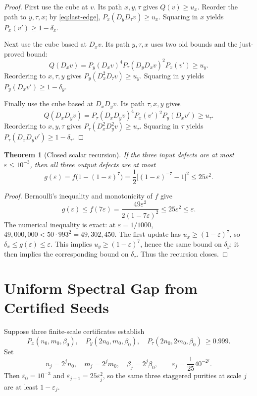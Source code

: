 \documentclass[11pt]{article}
\newcommand{\ee}{\varepsilon}
\newtheorem{theorem}{Theorem}
\begin{document}
\begin{proof}
	First use the cube at \(v\). Its path \(x,y,\tau\) gives
	\(Q(v)\ge u_x\). Reorder the path to \(y,\tau,x\); by
	\eqref{eq:last-edge},
	\(P_x(D_yD_\tau v)\ge u_x\).
	Squaring in \(x\) yields \(P_x(v')\ge1-\delta_x\).

	Next use the cube based at \(D_xv\). Its path \(y,\tau,x\) uses two
	old bounds and the just-proved bound:
	\[
		Q(D_xv)=P_y(D_xv)^4P_\tau(D_yD_xv)^2P_x(v')\ge u_y.
	\]
	Reordering to \(x,\tau,y\) gives
	\(P_y(D_x^2D_\tau v)\ge u_y\).
	Squaring in \(y\) yields \(P_y(D_xv')\ge1-\delta_y\).

	Finally use the cube based at \(D_xD_yv\). Its path \(\tau,x,y\)
	gives
	\[
		Q(D_xD_yv)=P_\tau(D_xD_yv)^4P_x(v')^2P_y(D_xv')\ge u_\tau.
	\]
	Reordering to \(x,y,\tau\) gives
	\(P_\tau(D_x^2D_y^2v)\ge u_\tau\).
	Squaring in \(\tau\) yields \(P_\tau(D_xD_yv')\ge1-\delta_\tau\).
\end{proof}

\begin{theorem}[Closed scalar recursion]
	If the three input defects are at most \(\ee\le10^{-3}\), then all
	three output defects are at most
	\begin{equation}
		g(\ee)=f\bigl(1-(1-\ee)^7\bigr)
		=\frac12\bigl[(1-\ee)^{-7}-1\bigr]^2
		\le25\ee^2.
		\label{eq:scalar}
	\end{equation}
\end{theorem}

\begin{proof}
	Bernoulli's inequality and monotonicity of \(f\) give
	\[
		g(\ee)\le f(7\ee)
		=\frac{49\ee^2}{2(1-7\ee)^2}
		\le25\ee^2\le\ee.
	\]
	The numerical inequality is exact: at \(\ee=1/1000\),
	\(49{,}000{,}000<50\cdot993^2=49{,}302{,}450\).
	The first update has \(u_x\ge(1-\ee)^7\), so
	\(\delta_x\le g(\ee)\le\ee\).
	This implies \(u_y\ge(1-\ee)^7\), hence the same bound on
	\(\delta_y\); it then implies the corresponding bound on
	\(\delta_\tau\). Thus the recursion closes.
\end{proof}

\section{Uniform Spectral Gap from Certified Seeds}

Suppose three finite-scale certificates establish
\begin{equation}
	P_x(n_0,m_0,\beta_0),\quad
	P_y(2n_0,m_0,\beta_0),\quad
	P_\tau(2n_0,2m_0,\beta_0)\ \ge0.999.
	\label{eq:certificates}
\end{equation}
Set
\begin{equation}
	n_j=2^jn_0,\quad m_j=2^jm_0,\quad\beta_j=2^j\beta_0,
	\qquad \ee_j=\frac1{25}40^{-2^j}.
	\label{eq:scales}
\end{equation}
Then \(\ee_0=10^{-3}\) and \(\ee_{j+1}=25\ee_j^2\), so the
same three staggered purities at scale \(j\) are at least
\(1-\ee_j\).
\end{document}

